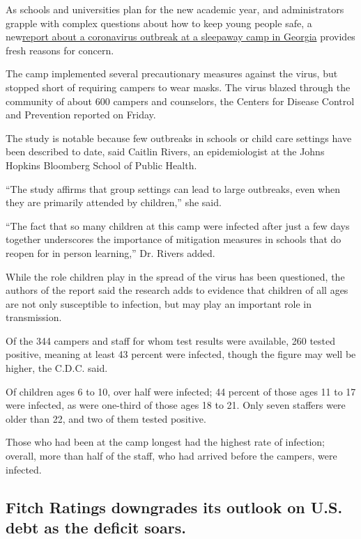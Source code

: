 As schools and universities plan for the new academic year, and
administrators grapple with complex questions about how to keep young
people safe, a
new\href{https://www.cdc.gov/mmwr/volumes/69/wr/mm6931e1.htm?s_cid=mm6931e1_w}{report
about a coronavirus outbreak at a sleepaway camp in Georgia} provides
fresh reasons for concern.

The camp implemented several precautionary measures against the virus,
but stopped short of requiring campers to wear masks. The virus blazed
through the community of about 600 campers and counselors, the Centers
for Disease Control and Prevention reported on Friday.

The study is notable because few outbreaks in schools or child care
settings have been described to date, said Caitlin Rivers, an
epidemiologist at the Johns Hopkins Bloomberg School of Public Health.

``The study affirms that group settings can lead to large outbreaks,
even when they are primarily attended by children,'' she said.

``The fact that so many children at this camp were infected after just a
few days together underscores the importance of mitigation measures in
schools that do reopen for in person learning,'' Dr. Rivers added.

While the role children play in the spread of the virus has been
questioned, the authors of the report said the research adds to evidence
that children of all ages are not only susceptible to infection, but may
play an important role in transmission.

Of the 344 campers and staff for whom test results were available, 260
tested positive, meaning at least 43 percent were infected, though the
figure may well be higher, the C.D.C. said.

Of children ages 6 to 10, over half were infected; 44 percent of those
ages 11 to 17 were infected, as were one-third of those ages 18 to 21.
Only seven staffers were older than 22, and two of them tested positive.

Those who had been at the camp longest had the highest rate of
infection; overall, more than half of the staff, who had arrived before
the campers, were infected.

\hypertarget{fitch-ratings-downgrades-its-outlook-on-us-debt-as-the-deficit-soars}{%
\subsection{Fitch Ratings downgrades its outlook on U.S. debt as the
deficit
soars.}\label{fitch-ratings-downgrades-its-outlook-on-us-debt-as-the-deficit-soars}}

